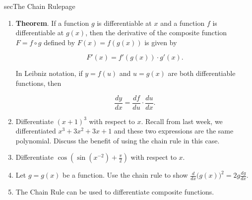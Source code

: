 \documentclass[../main]{subfiles}
\begin{document}
%
%


\begin{outline}{sec}{The Chain Rule}{page} \label{outline:chain}
  \begin{enumerate}

    \item \textbf{Theorem}. If a function \(g\) is differentiable at \(x\) and a function \(f\) is differentiable at \(g(x)\), then the derivative of the composite function \(F = f \circ g\) defined by \(F(x) = f(g(x))\) is given by
      \begin{mdframed}[style=simple]
        \[
          F'(x) = f'(g(x)) \cdot g'(x).
        \]
      \end{mdframed}
        
      In Leibniz notation, if \(y = f(u)\) and \(u = g(x)\) are both differentiable functions, then
      \begin{mdframed}[style=simple]
        \[
          \frac{dy}{dx} = \frac{df}{du} \cdot \frac{du}{dx}.%
        \]
      \end{mdframed}
        

    \item Differentiate \((x+1)^{3}\) with respect to \(x\). Recall from last week, we differentiated \(x^{3} + 3 x^{2} + 3x + 1\) and these two expressions are the same polynomial. Discuss the benefit of using the chain rule in this case.
    \item Differentiate \(\cos(\sin(x^{-2}) + \frac{\pi}{2})\) with respect to \(x\).  
    \item Let \(g = g(x)\) be a function.  Use the chain rule to show \(\frac{d}{dx} \big( g(x) \big)^{2} = 2g \frac{dg}{dx}\).

    \item {The Chain Rule can be used to differentiate composite functions.}
  \end{enumerate}
\end{outline}

 
\end{document}

